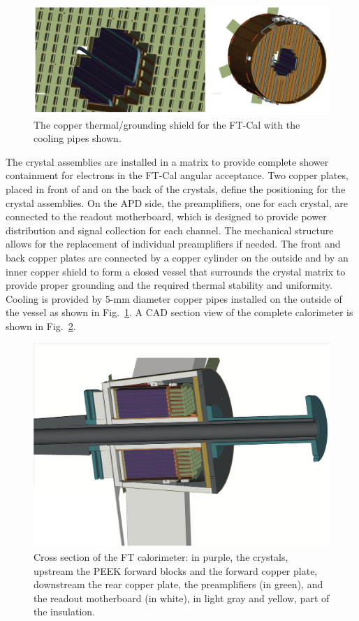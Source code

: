 \begin{figure}[th!]
\centering 
\includegraphics[width=1.0\columnwidth]{./fig/raff.jpeg}
\caption{The copper thermal/grounding shield for the FT-Cal with the cooling pipes shown.}
\label{fig:piping} 
\end{figure}

The crystal assemblies are installed in a matrix to provide complete shower containment for electrons in the FT-Cal
angular acceptance. Two copper plates, placed in front of and on the back of the crystals, define the positioning for
the crystal assemblies. On the APD side, the preamplifiers, one for each crystal, are connected to the readout
motherboard, which is designed to provide power distribution and signal collection for each channel. The mechanical
structure allows for the replacement of individual preamplifiers if needed. The front and back copper plates are
connected by a copper cylinder on the outside and by an inner copper shield to form a closed vessel that surrounds
the crystal matrix to provide proper grounding and the required thermal stability and uniformity. Cooling is provided
by 5-mm diameter copper pipes installed on the outside of the vessel as shown in Fig.~\ref{fig:piping}. A CAD section
view of the complete calorimeter is shown in Fig.~\ref{fig:calsec}.

\begin{figure}[th!]
\centering 
\includegraphics[width=1.0\columnwidth]{./fig/section.png}
\caption{Cross section of the FT calorimeter: in purple, the crystals, upstream the PEEK forward blocks and the
  forward copper plate, downstream the rear copper plate, the preamplifiers (in green), and the readout
  motherboard (in white), {\color{red} in light gray and yellow, part of the insulation.}}
\label{fig:calsec} 
\end{figure}

